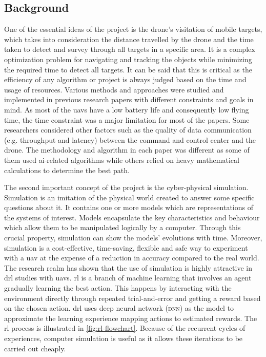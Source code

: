 \documentclass[../main.tex]{subfiles}
\begin{document}
\subsection{Background}

One of the essential ideas of the project 
is the drone's visitation of mobile 
targets, which takes into consideration 
the distance travelled by the drone and 
the time taken to detect and survey 
through all targets in a specific area.
It is a complex optimization problem 
for navigating and tracking the objects 
while minimizing the required time to detect all targets.
It can be said that this is critical as the 
efficiency of any algorithm 
or project is always judged based on the time 
and usage of resources.
Various methods and approaches were studied 
and implemented 
in previous research papers with different 
constraints and 
goals in mind.
As most of the \glspl{uav} have a low battery life 
and consequently low flying time, the time 
constraint was a major limitation 
for most of the papers. 
Some researchers considered other factors such 
as the quality 
of data communication (e.g. throughput and latency) 
between the command and control 
center and the drone.
The methodology and algorithm in each paper was 
different 
as some of them used \gls{ai}-related algorithms while 
others relied 
on heavy mathematical calculations to determine 
the best path.

The second important concept of the project is the cyber-physical simulation.
Simulation is an imitation of the physical world
created to answer some specific questions about it.
It contains one or more models 
which are representations of the systems of interest.
Models encapsulate the key characteristics and behaviour 
which allow them to be manipulated logically by a computer.
Through this crucial property, simulation can show 
the models' evolutions with time.
Moreover, simulation is a cost-effective, time-saving, flexible 
and safe way to experiment with a \gls{uav}
at the expense of a reduction in accuracy compared to the real world.
The research realm has shown that the use of simulation 
is highly attractive in \gls{drl} studies with \glspl{uav}.
\gls{rl} is a branch of machine learning that involves
an agent gradually learning the best action. This happens by 
interacting with 
the environment directly through repeated trial-and-error
and getting a reward based on the chosen action.
\gls{drl} uses deep neural network (\textsc{dnn}) as the
model to approximate the learning experience mapping
actions to estimated rewards.
The \gls{rl} process is illustrated in 
\cref{fig:rl-flowchart}.
Because of the recurrent cycles of experiences, 
computer simulation is useful as it
allows these iterations to be carried out cheaply.
\end{document}
